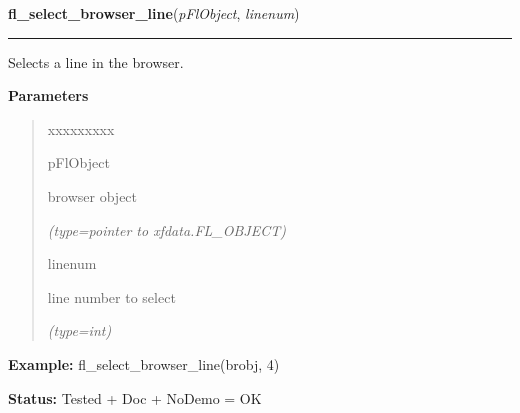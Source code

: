     \label{xformslib:flbrowser:fl_select_browser_line}

    \vspace{0.5ex}

\hspace{.8\funcindent}\begin{boxedminipage}{\funcwidth}

    \raggedright \textbf{fl\_select\_browser\_line}(\textit{pFlObject}, \textit{linenum})

    \vspace{-1.5ex}

    \rule{\textwidth}{0.5\fboxrule}
\setlength{\parskip}{2ex}
    Selects a line in the browser.

\setlength{\parskip}{1ex}
      \textbf{Parameters}
      \vspace{-1ex}

      \begin{quote}
        \begin{Ventry}{xxxxxxxxx}

          \item[pFlObject]

          browser object

            {\it (type=pointer to xfdata.FL\_OBJECT)}

          \item[linenum]

          line number to select

            {\it (type=int)}

        \end{Ventry}

      \end{quote}

\textbf{Example:} fl\_select\_browser\_line(brobj, 4)



\textbf{Status:} Tested + Doc + NoDemo = OK



    \end{boxedminipage}

    \label{xformslib:flbrowser:fl_deselect_browser_line}

    \vspace{0.5ex}

